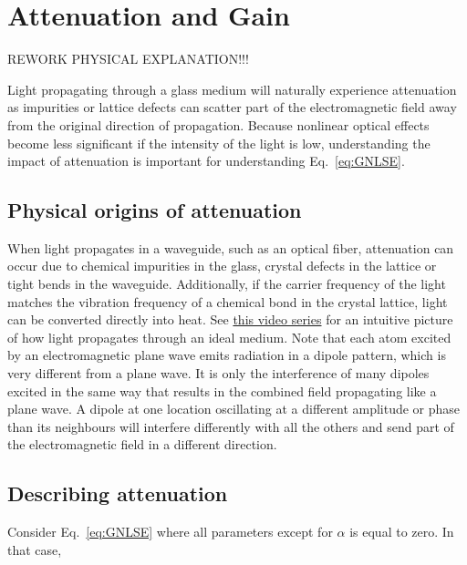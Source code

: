 \chapter{Attenuation and Gain}
\label{ch:attenuation}

REWORK PHYSICAL EXPLANATION!!!

Light propagating through a glass medium will naturally experience attenuation as impurities or lattice defects can scatter part of the electromagnetic field away from the original direction of propagation. Because nonlinear optical effects become less significant if the intensity of the light is low, understanding the impact of attenuation is important for understanding Eq.~\ref{eq:GNLSE}.


\section{Physical origins of attenuation}
When light propagates in a waveguide, such as an optical fiber, attenuation can occur due to chemical impurities in the glass, crystal defects in the lattice or tight bends in the waveguide. Additionally, if the carrier frequency of the light matches the vibration frequency of a chemical bond in the crystal lattice, light can be converted directly into heat. See \href{https://www.youtube.com/watch?v=QCX62YJCmGk&list=PLZHQObOWTQDMKqfyUvG2kTlYt-QQ2x-ui}{this video series} for an intuitive picture of how light propagates through an ideal medium. Note that each atom excited by an electromagnetic plane wave emits radiation in a dipole pattern, which is very different from a plane wave. It is only the interference of many dipoles excited in the same way that results in the combined field propagating like a plane wave. A dipole at one location oscillating at a different amplitude or phase than its neighbours will interfere differently with all the others and send part of the electromagnetic field in a different direction. 


\section{Describing attenuation}

Consider Eq.~\ref{eq:GNLSE} where all parameters except for $\alpha$ is equal to zero. In that case,

